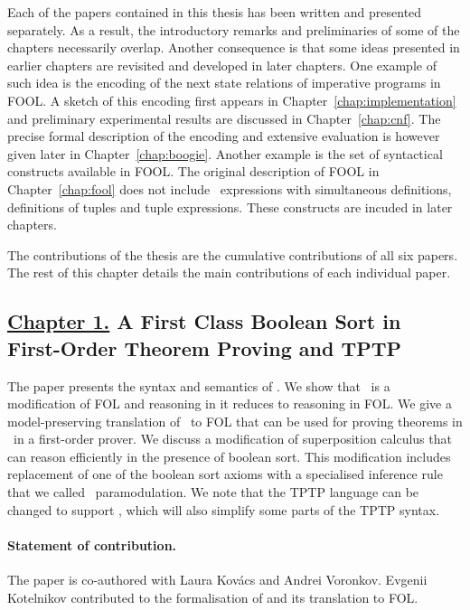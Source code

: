 Each of the papers contained in this thesis has been written and presented separately. As a result, the introductory remarks and preliminaries of some of the chapters necessarily overlap. Another consequence is that some ideas presented in earlier chapters are revisited and developed in later chapters. One example of such idea is the encoding of the next state relations of imperative programs in FOOL. A sketch of this encoding first appears in Chapter~\ref{chap:implementation} and preliminary experimental results are discussed in Chapter~\ref{chap:cnf}. The precise formal description of the encoding and extensive evaluation is however given later in Chapter~\ref{chap:boogie}. Another example is the set of syntactical constructs available in FOOL. The original description of FOOL in Chapter~\ref{chap:fool} does not include \LETIN\ expressions with simultaneous definitions, definitions of tuples and tuple expressions. These constructs are incuded in later chapters.

The contributions of the thesis are the cumulative contributions of all six papers. The rest of this chapter details the main contributions of each individual paper.

\subsection*{\hyperref[chap:fool]{Chapter 1.} A First Class Boolean Sort in\\First-Order Theorem Proving and TPTP}
The paper presents the syntax and semantics of \folb. We show that \folb\ is a modification of FOL and reasoning in it reduces to reasoning in FOL. We give a model-preserving \iffalse(modulo introduced definitions)\fi translation of \folb\ to FOL that can be used for proving theorems in \folb\ in a first-order prover. We discuss a modification of superposition calculus that can reason efficiently in the presence of boolean sort. This modification includes replacement of one of the boolean sort axioms with a specialised inference rule that we called \folb\ paramodulation. We note that the TPTP language can be changed to support \folb, which will also simplify some parts of the TPTP syntax. 

\paragraph{Statement of contribution.} The paper is co-authored with Laura Kov\'{a}cs and Andrei Voronkov. Evgenii Kotelnikov contributed to the formalisation of \folb{} and its translation to FOL.

